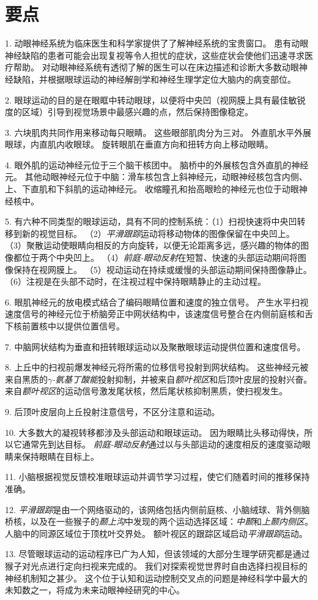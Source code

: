 \section{要点}

1. 动眼神经系统为临床医生和科学家提供了了解神经系统的宝贵窗口。
患有动眼神经缺陷的患者可能会出现复视等令人担忧的症状，这些症状会使他们迅速寻求医疗帮助。
对动眼神经系统有透彻了解的医生可以在床边描述和诊断大多数动眼神经缺陷，并根据眼球运动的神经解剖学和神经生理学定位大脑内的病变部位。


2. 眼球运动的目的是在眼眶中转动眼球，以便将中央凹（视网膜上具有最佳敏锐度的区域）引导到视觉场景中最感兴趣的点，然后保持图像稳定。


3. 六块肌肉共同作用来移动每只眼睛。
这些眼部肌肉分为三对。
外直肌水平外展眼球，内直肌内收眼球。
旋转眼肌在垂直方向和扭转方向上移动眼睛。


4. 眼外肌的运动神经元位于三个脑干核团中。
脑桥中的外展核包含外直肌的神经元。
其他动眼神经元位于中脑：滑车核包含上斜神经元，动眼神经核包含内侧、上、下直肌和下斜肌的运动神经元。
收缩瞳孔和抬高眼睑的神经元也位于动眼神经核中。


5. 有六种不同类型的眼球运动，具有不同的控制系统：（1）扫视快速将中央凹转移到新的视觉目标。
（2）\textit{平滑跟踪}运动将移动物体的图像保留在中央凹上。
（3）聚散运动使眼睛向相反的方向旋转，以便无论距离多远，感兴趣的物体的图像都位于两个中央凹上。
（4）\textit{前庭-眼动反射}在短暂、快速的头部运动期间将图像保持在视网膜上。
（5）视动运动在持续或缓慢的头部运动期间保持图像静止。
（6）注视是在头部不动时，在注视过程中保持眼睛静止的主动过程。


6. 眼肌神经元的放电模式结合了编码眼睛位置和速度的独立信号。
产生水平扫视速度信号的神经元位于桥脑旁正中网状结构中，该速度信号整合在内侧前庭核和舌下核前置核中以提供位置信号。


7. 中脑网状结构为垂直和扭转眼球运动以及聚散眼球运动提供位置和速度信号。


8. 上丘中的扫视前爆发神经元将所需的位移信号投射到网状结构。
这些神经元被来自黑质的\textit{$ \gamma $-氨基丁酸能}投射抑制，并被来自\textit{额叶视区}和后顶叶皮层的投射兴奋。
来自\textit{额叶视区}的运动信号激发尾状核，然后尾状核抑制黑质，使扫视发生。


9. 后顶叶皮层向上丘投射注意信号，不区分注意和运动。


10. 大多数大的凝视转移都涉及头部运动和眼球运动。
因为眼睛比头移动得快，所以它通常先到达目标。
\textit{前庭-眼动反射}通过以与头部运动的速度相反的速度驱动眼睛来保持眼睛在目标上。


11. 小脑根据视觉反馈校准眼球运动并调节学习过程，使它们随着时间的推移保持准确。


12. \textit{平滑跟踪}是由一个网络驱动的，该网络包括内侧前庭核、小脑绒球、背外侧脑桥核，以及在一些猴子的\textit{颞上沟}中发现的两个运动选择区域：\textit{中颞}和\textit{上颞内侧区}。
人脑中的同源区域位于顶枕叶交界处。
额叶视区的跟踪区域启动\textit{平滑跟踪}运动。


13. 尽管眼球运动的运动程序已广为人知，但该领域的大部分生理学研究都是通过猴子对光点进行定向扫视来完成的。
我们对探索视觉世界时自由选择扫视目标的神经机制知之甚少。
这个位于认知和运动控制交叉点的问题是神经科学中最大的未知数之一，将成为未来动眼神经研究的中心。




